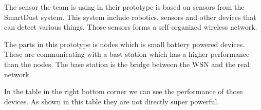 The sensor the team is using in their prototype is based on sensors from the SmartDust system. This system include robotics, sensors and other devices that can detect various things. Those sensors forms a self organized wireless network. 

\bigskip


The parts in this prototype is nodes which is small battery powered devices. These are communicating with a bast station which has a higher performance than the nodes. The base station is the bridge between the WSN and the real network. 

\bigskip


In the table in the right bottom corner we can see the performance of those devices. As shown in this table they are not directly super powerful.